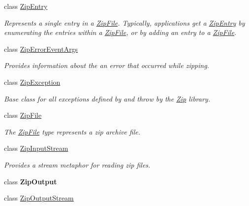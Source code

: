 \begin{DoxyCompactItemize}
class \mbox{\hyperlink{class_super_tiled2_unity_1_1_ionic_1_1_zip_1_1_zip_entry}{Zip\+Entry}}
\begin{DoxyCompactList}\small\item\em Represents a single entry in a \mbox{\hyperlink{class_super_tiled2_unity_1_1_ionic_1_1_zip_1_1_zip_file}{Zip\+File}}. Typically, applications get a \mbox{\hyperlink{class_super_tiled2_unity_1_1_ionic_1_1_zip_1_1_zip_entry}{Zip\+Entry}} by enumerating the entries within a \mbox{\hyperlink{class_super_tiled2_unity_1_1_ionic_1_1_zip_1_1_zip_file}{Zip\+File}}, or by adding an entry to a \mbox{\hyperlink{class_super_tiled2_unity_1_1_ionic_1_1_zip_1_1_zip_file}{Zip\+File}}. \end{DoxyCompactList}\item 
class \mbox{\hyperlink{class_super_tiled2_unity_1_1_ionic_1_1_zip_1_1_zip_error_event_args}{Zip\+Error\+Event\+Args}}
\begin{DoxyCompactList}\small\item\em Provides information about the an error that occurred while zipping. \end{DoxyCompactList}\item 
class \mbox{\hyperlink{class_super_tiled2_unity_1_1_ionic_1_1_zip_1_1_zip_exception}{Zip\+Exception}}
\begin{DoxyCompactList}\small\item\em Base class for all exceptions defined by and throw by the \mbox{\hyperlink{namespace_super_tiled2_unity_1_1_ionic_1_1_zip}{Zip}} library. \end{DoxyCompactList}\item 
class \mbox{\hyperlink{class_super_tiled2_unity_1_1_ionic_1_1_zip_1_1_zip_file}{Zip\+File}}
\begin{DoxyCompactList}\small\item\em The \mbox{\hyperlink{class_super_tiled2_unity_1_1_ionic_1_1_zip_1_1_zip_file}{Zip\+File}} type represents a zip archive file. \end{DoxyCompactList}\item 
class \mbox{\hyperlink{class_super_tiled2_unity_1_1_ionic_1_1_zip_1_1_zip_input_stream}{Zip\+Input\+Stream}}
\begin{DoxyCompactList}\small\item\em Provides a stream metaphor for reading zip files. \end{DoxyCompactList}\item 
class {\bfseries Zip\+Output}
\item 
class \mbox{\hyperlink{class_super_tiled2_unity_1_1_ionic_1_1_zip_1_1_zip_output_stream}{Zip\+Output\+Stream}}

\end{DoxyCompactItemize}
